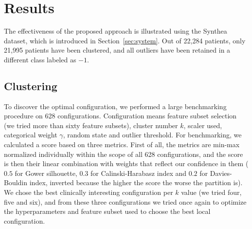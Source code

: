 \section{Results}

\label{sec:results}

The effectiveness of the proposed approach is illustrated using the Synthea dataset, which is introduced in Section~\ref{sec:system}. Out of 22{,}284 patients, only 21{,}995 patients have been clustered, and all outliers have been retained in a different class labeled as $-1$.

\subsection{Clustering}

To discover the optimal configuration, we performed a large benchmarking procedure on 628 configurations. Configuration means feature subset selection (we tried more than sixty feature subsets), cluster number $k$, scaler used, categorical weight $\gamma$, random state and outlier threshold. For benchmarking, we calculated a score based on three metrics. First of all, the metrics are min-max normalized individually within the scope of all 628 configurations, and the score is then their linear combination with weights that reflect our confidence in them ($0.5$ for Gower silhouette, $0.3$ for Calinski-Harabasz index and $0.2$ for Davies-Bouldin index, inverted because the higher the score the worse the partition is). We chose the best clinically interesting configuration per $k$ value (we tried four, five and six), and from these three configurations we tried once again to optimize the hyperparameters and feature subset used to choose the best local configuration.

